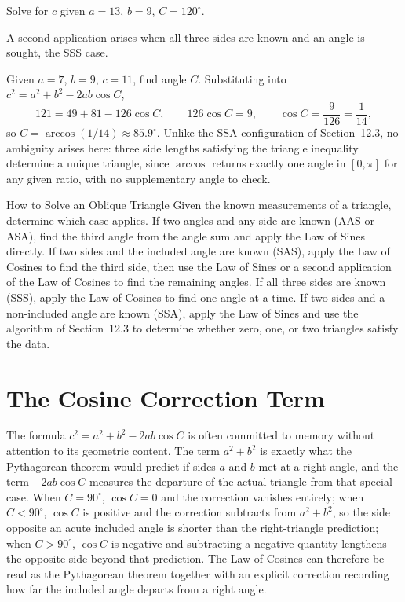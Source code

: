 \begin{practicenow}
Solve for $c$ given $a = 13$, $b = 9$, $C = 120^\circ$.
\end{practicenow}

A second application arises when all three sides are known and an angle
is sought, the SSS case.

\begin{example}
Given $a = 7$, $b = 9$, $c = 11$, find angle $C$. Substituting into
$c^2 = a^2 + b^2 - 2ab\cos C$,
\[
121 = 49 + 81 - 126\cos C, \qquad 126\cos C = 9, \qquad \cos C =
\frac{9}{126} = \frac{1}{14},
\]
so $C = \arccos(1/14) \approx 85.9^\circ$. Unlike the SSA configuration of
Section~12.3, no ambiguity arises here: three side lengths satisfying the
triangle inequality determine a unique triangle, since $\arccos$ returns
exactly one angle in $[0,\pi]$ for any given ratio, with no supplementary
angle to check.
\end{example}

\begin{algorithmproc}{How to Solve an Oblique Triangle}
Given the known measurements of a triangle, determine which case applies.
If two angles and any side are known (AAS or ASA), find the third angle
from the angle sum and apply the Law of Sines directly. If two sides and
the included angle are known (SAS), apply the Law of Cosines to find the
third side, then use the Law of Sines or a second application of the Law
of Cosines to find the remaining angles. If all three sides are known
(SSS), apply the Law of Cosines to find one angle at a time. If two sides
and a non-included angle are known (SSA), apply the Law of Sines and use
the algorithm of Section~12.3 to determine whether zero, one, or two
triangles satisfy the data.
\end{algorithmproc}

\section{The Cosine Correction Term}

The formula $c^2 = a^2 + b^2 - 2ab\cos C$ is often committed to memory
without attention to its geometric content. The term $a^2 + b^2$ is
exactly what the Pythagorean theorem would predict if sides $a$ and $b$
met at a right angle, and the term $-2ab\cos C$ measures the departure of
the actual triangle from that special case. When $C = 90^\circ$, $\cos C =
0$ and the correction vanishes entirely; when $C < 90^\circ$, $\cos C$ is
positive and the correction subtracts from $a^2+b^2$, so the side opposite
an acute included angle is shorter than the right-triangle prediction;
when $C > 90^\circ$, $\cos C$ is negative and subtracting a negative
quantity lengthens the opposite side beyond that prediction. The Law of
Cosines can therefore be read as the Pythagorean theorem together with an
explicit correction recording how far the included angle departs from a
right angle.

